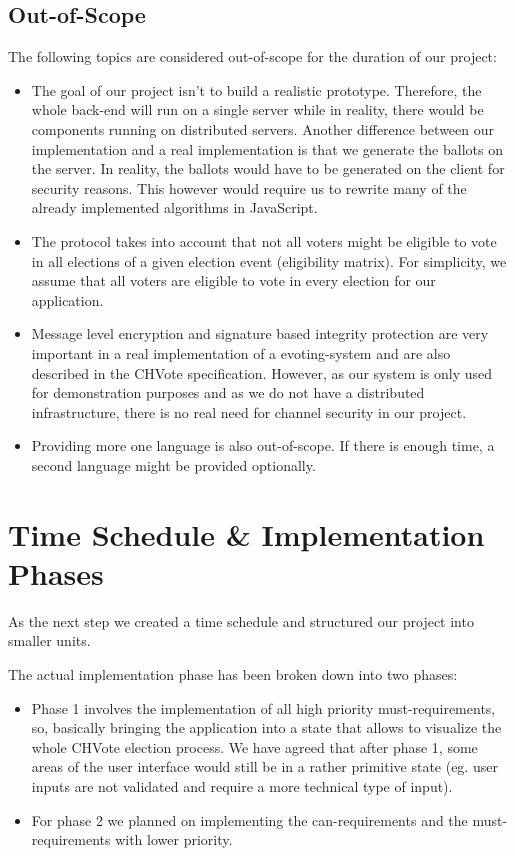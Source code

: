 \subsection{Out-of-Scope}
The following topics are considered out-of-scope for the duration of our project:
\begin{itemize}
	\item The goal of our project isn't to build a realistic prototype. Therefore, the whole back-end will run on a single server while in reality, there would be components running on distributed servers. Another difference between our implementation and a real implementation is that we generate the ballots on the server. In reality, the ballots would have to be generated on the client for security reasons. This however would require us to rewrite many of the already implemented algorithms in JavaScript.
	\item The protocol takes into account that not all voters might be eligible to vote in all elections of a given election event (eligibility matrix). For simplicity, we assume that all voters are eligible to vote in every election for our application.
	\item Message level encryption and signature based integrity protection are very important in a real implementation of a evoting-system and are also described in the CHVote specification. However, as our system is only used for demonstration purposes and as we do not have a distributed infrastructure, there is no real need for channel security in our project.
	\item Providing more one language is also out-of-scope. If there is enough time, a second language might be provided optionally.
\end{itemize}

\section{Time Schedule \& Implementation Phases}
As the next step we created a time schedule and structured our project into smaller units.

The actual implementation phase has been broken down into two phases:

\begin{itemize}
	\item Phase 1 involves the implementation of all high priority must-requirements, so, basically bringing the application into a state that allows to visualize the whole CHVote election process. We have agreed that after phase 1, some areas of the user interface would still be in a rather primitive state (eg. user inputs are not validated and require a more technical type of input).
	\item For phase 2 we planned on implementing the can-requirements and the must-requirements with lower priority.
\end{itemize}

